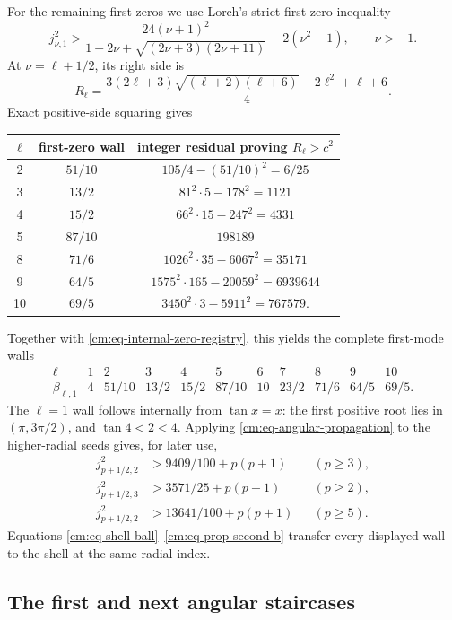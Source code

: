 \documentclass[11pt]{article}
\numberwithin{equation}{section}
\theoremstyle{definition}
\theoremstyle{remark}
\begin{document}
For the remaining first zeros we use Lorch's strict first-zero inequality
\cite{Lorch1993}
\[
 j_{\nu,1}^2>
 \frac{24(\nu+1)^2}
 {1-2\nu+\sqrt{(2\nu+3)(2\nu+11)}}-2(\nu^2-1),
 \qquad \nu>-1.
\]
At \(\nu=\ell+1/2\), its right side is
\[
 R_\ell=\frac{3(2\ell+3)\sqrt{(\ell+2)(\ell+6)}
 -2\ell^2+\ell+6}{4}.
\]
Exact positive-side squaring gives
\begin{center}
\small
\begin{tabular}{c|c|c}
\(\ell\)&first-zero wall&integer residual proving \(R_\ell>c^2\)\\ \hline
2&\(51/10\)&\(105/4-(51/10)^2=6/25\)\\
3&\(13/2\)&\(81^2\cdot5-178^2=1121\)\\
4&\(15/2\)&\(66^2\cdot15-247^2=4331\)\\
5&\(87/10\)&\(198189\)\\
8&\(71/6\)&\(1026^2\cdot35-6067^2=35171\)\\
9&\(64/5\)&\(1575^2\cdot165-20059^2=6939644\)\\
10&\(69/5\)&\(3450^2\cdot3-5911^2=767579\).
\end{tabular}
\end{center}
Together with \eqref{cm:eq-internal-zero-registry}, this yields the complete
first-mode walls
\begin{equation}
\begin{array}{c|cccccccccc}
\ell&1&2&3&4&5&6&7&8&9&10\\ \hline
\beta_{\ell,1}&4&51/10&13/2&15/2&87/10&10&23/2&71/6&64/5&69/5.
\end{array}
 \label{cm:eq-first-zero-table}
\end{equation}
The \(\ell=1\) wall follows internally from \(\tan x=x\): the first
positive root lies in \((\pi,3\pi/2)\), and \(\tan4<2<4\).
Applying \eqref{cm:eq-angular-propagation} to the higher-radial seeds gives,
for later use,
\begin{align}
 j_{p+1/2,2}^2&>9409/100+p(p+1) &&(p\geq3),\label{cm:eq-prop-second-a}\\
 j_{p+1/2,3}^2&>3571/25+p(p+1) &&(p\geq2),\label{cm:eq-prop-third}\\
 j_{p+1/2,2}^2&>13641/100+p(p+1) &&(p\geq5).
 \label{cm:eq-prop-second-b}
\end{align}
Equations \eqref{cm:eq-shell-ball}--\eqref{cm:eq-prop-second-b} transfer
every displayed wall to the shell at the same radial index.

\subsection{The first and next angular staircases}
\end{document}
